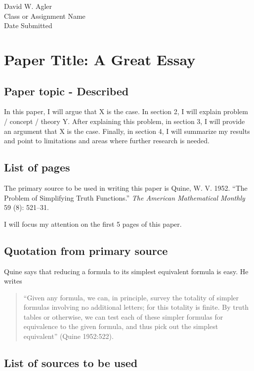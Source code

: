 David W. Agler\\
Class or Assignment Name\\
Date Submitted

\section{Paper Title: A Great Essay}\label{paper-title-a-great-essay}

\subsection{Paper topic - Described}\label{paper-topic---described}

In this paper, I will argue that X is the case. In section 2, I will
explain problem / concept / theory Y. After explaining this problem, in
section 3, I will provide an argument that X is the case. Finally, in
section 4, I will summarize my results and point to limitations and
areas where further research is needed.

\subsection{List of pages}\label{list-of-pages}

The primary source to be used in writing this paper is Quine, W. V.
1952. ``The Problem of Simplifying Truth Functions.'' \emph{The American
Mathematical Monthly} 59 (8): 521--31.

I will focus my attention on the first 5 pages of this paper.

\subsection{Quotation from primary
source}\label{quotation-from-primary-source}

Quine says that reducing a formula to its simplest equivalent formula is
easy. He writes

\begin{quote}
``Given any formula, we can, in principle, survey the totality of
simpler formulas involving no additional letters; for this totality is
finite. By truth tables or otherwise, we can test each of these simpler
formulas for equivalence to the given formula, and thus pick out the
simplest equivalent'' (Quine 1952:522).
\end{quote}

\subsection{List of sources to be
used}\label{list-of-sources-to-be-used}

